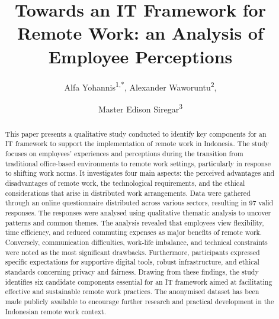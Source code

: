 \documentclass{infotel}
\begin{document}
\setcounter{page}{1}


\title{Towards an IT Framework for Remote Work: an Analysis of Employee Perceptions}

\author{Alfa Yohannis\textsuperscript{1,*}, Alexander Waworuntu\textsuperscript{2},}
\author{Master Edison Siregar\textsuperscript{3}}

\maketitle


\begin{abstract}
	This paper presents a qualitative study conducted to identify key components for an IT framework to support the implementation of remote work in Indonesia. The study focuses on employees’ experiences and perceptions during the transition from traditional office-based environments to remote work settings, particularly in response to shifting work norms. It investigates four main aspects: the perceived advantages and disadvantages of remote work, the technological requirements, and the ethical considerations that arise in distributed work arrangements. Data were gathered through an online questionnaire distributed across various sectors, resulting in 97 valid responses. The responses were analysed using qualitative thematic analysis to uncover patterns and common themes. The analysis revealed that employees view flexibility, time efficiency, and reduced commuting expenses as major benefits of remote work. Conversely, communication difficulties, work-life imbalance, and technical constraints were noted as the most significant drawbacks. Furthermore, participants expressed specific expectations for supportive digital tools, robust infrastructure, and ethical standards concerning privacy and fairness. Drawing from these findings, the study identifies six candidate components essential for an IT framework aimed at facilitating effective and sustainable remote work practices. The anonymised dataset has been made publicly available to encourage further research and practical development in the Indonesian remote work context.
\end{abstract}
\end{document}
